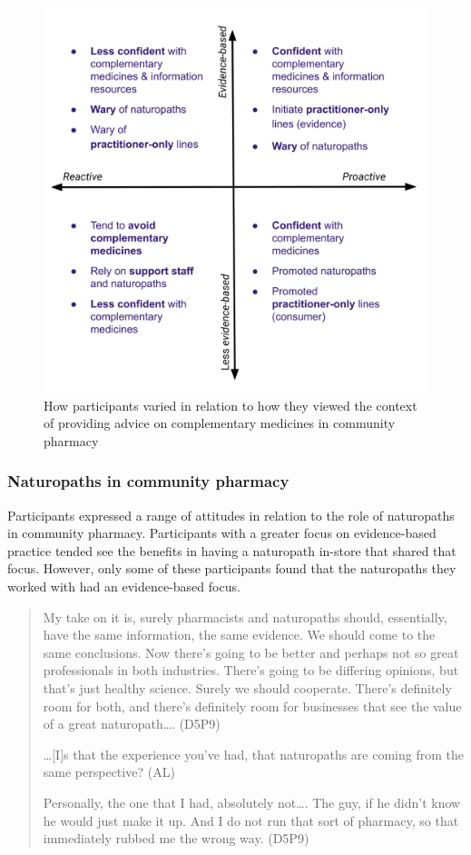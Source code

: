 \documentclass[11pt,a4paper]{article}
\begin{document}
\begin{figure}
\centering
\includegraphics{files/CMEthics_context2.png}
\caption{How participants varied in relation to how they viewed the
context of providing advice on complementary medicines in community
pharmacy \label{fig_context2}}
\end{figure}

\subsubsection{Naturopaths in community
pharmacy}\label{naturopaths-in-community-pharmacy}

Participants expressed a range of attitudes in relation to the role of
naturopaths in community pharmacy. Participants with a greater focus on
evidence-based practice tended see the benefits in having a naturopath
in-store that shared that focus. However, only some of these
participants found that the naturopaths they worked with had an
evidence-based focus.

\begin{quote}
My take on it is, surely pharmacists and naturopaths should,
essentially, have the same information, the same evidence. We should
come to the same conclusions. Now there's going to be better and perhaps
not so great professionals in both industries. There's going to be
differing opinions, but that's just healthy science. Surely we should
cooperate. There's definitely room for both, and there's definitely room
for businesses that see the value of a great naturopath\ldots{}. (D5P9)

\ldots{}{[}I{]}s that the experience you've had, that naturopaths are
coming from the same perspective? (AL)

Personally, the one that I had, absolutely not\ldots{}. The guy, if he
didn't know he would just make it up. And I do not run that sort of
pharmacy, so that immediately rubbed me the wrong way. (D5P9)
\end{quote}
\end{document}

